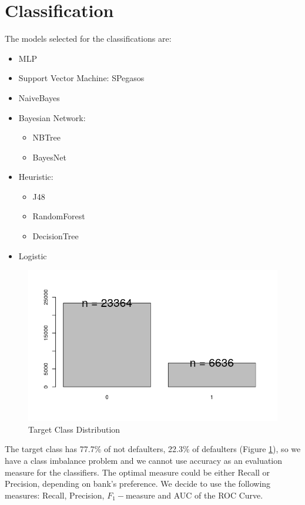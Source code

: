 \documentclass[fleqn,10pt]{SelfArx} %
\begin{document}
	\section{Classification}
	The models selected for the classifications are: 
	\begin{itemize}[noitemsep]
		\item MLP
		\item Support Vector Machine: SPegasos
		\item NaiveBayes
		
		\item Bayesian Network:
		\begin{itemize}[noitemsep]
				\item NBTree
				\item BayesNet
		\end{itemize}
		
		\item  Heuristic:
		\begin{itemize}[noitemsep]
			 \item J48
			 \item RandomForest
			 \item DecisionTree
		\end{itemize}
		
		\item Logistic
		
		
	\end{itemize}

	\begin{figure}[h]
	\includegraphics[width=\linewidth]{class.png}
	\caption{Target Class Distribution}
	\label{fig:class}
	\end{figure}

The target class has 77.7\% of not defaulters, 22.3\% of defaulters (Figure \ref{fig:class}), so we have a class imbalance problem and we cannot use accuracy as an evaluation measure for the classifiers.
The optimal measure could be either Recall or Precision, depending on bank's preference.
We decide to use the following measures: Recall, Precision, $F_1-$measure and AUC of the ROC Curve.
\end{document}
